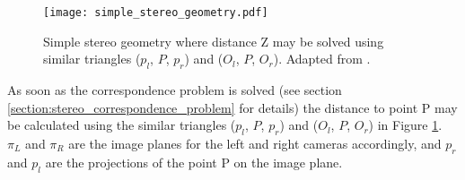 \documentclass[12pt,a4paper,oneside,pdftex]{report}
\begin{document}
{\begin{figure}[ht]
  \begin{center}
    \texttt{[image: simple\_stereo\_geometry.pdf]}
    \caption{Simple stereo geometry where distance Z may be solved using similar triangles ($p_l$, $P$, $p_r$) and ($O_l$, $P$, $O_r$). Adapted from \citep{Trucco98}.}
    \label{fig:simple_stereo_geometry}
  \end{center}
\end{figure}


As soon as the correspondence problem is solved (see section \ref{section:stereo_correspondence_problem} for details) the distance to point P may be calculated using the similar triangles ($p_l$, $P$, $p_r$) and ($O_l$, $P$, $O_r$) in Figure \ref{fig:simple_stereo_geometry}. $\pi_L$ and $\pi_R$ are the image planes for the left and right cameras accordingly, and $p_r$ and $p_l$ are the projections of the point P on the image plane. 










}
\end{document}
